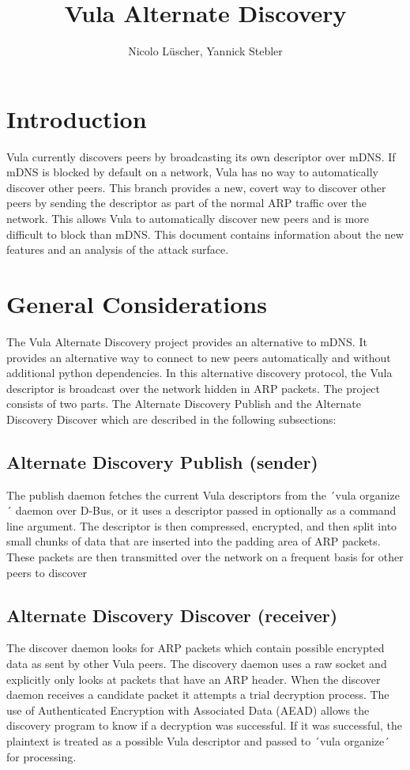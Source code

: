 \documentclass[a4paper,11pt]{report}
\title{Vula Alternate Discovery}
\author{Nicolo Lüscher, Yannick Stebler}
\begin{document}
\maketitle
\tableofcontents

\chapter{Introduction}
Vula currently discovers peers by broadcasting its own descriptor over mDNS. 
If mDNS is blocked by default on a network, Vula has no way to automatically discover other peers. This branch provides a new, covert way to discover other peers by sending the descriptor as part of the normal ARP traffic over the network. This allows Vula to automatically discover new peers and is more difficult to block than mDNS. This document contains information about the new features and an analysis of the attack surface. 

\chapter{General Considerations}
The Vula Alternate Discovery project provides an alternative to mDNS. It provides an alternative way to connect to new peers automatically and without additional python dependencies. In this alternative discovery protocol, the Vula descriptor is broadcast over the network hidden in ARP packets.
The project consists of two parts. The Alternate Discovery Publish and the Alternate Discovery Discover which are described in the following subsections:
\section{Alternate Discovery Publish (sender)}
The publish daemon fetches the current Vula descriptors from the ´vula organize´ daemon over D-Bus, or it uses a descriptor passed in optionally as a command line argument.
The descriptor is then compressed, encrypted, and then split into small chunks of data that are inserted into the padding area of ARP packets. These packets are then transmitted over the network on a frequent basis for other peers to discover
\section{Alternate Discovery Discover (receiver)}
The discover daemon looks for ARP packets which contain possible encrypted data as sent by other Vula peers. The discovery daemon uses a raw socket and explicitly only looks at packets that have an ARP header. When the discover daemon receives a candidate packet it attempts a trial decryption process. The use of Authenticated Encryption with Associated Data (AEAD) allows the discovery program to know if a decryption was successful. If it was successful, the plaintext is treated as a possible Vula descriptor and passed to ´vula organize´ for processing.
\end{document}
